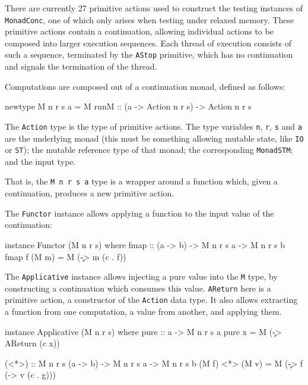 
There are currently 27 primitive actions used to construct the testing
instances of \verb|MonadConc|, one of which only arises when testing
under relaxed memory. These primitive actions contain a continuation,
allowing individual actions to be composed into larger execution
sequences. Each thread of execution consists of such a sequence,
terminated by the \verb|AStop| primitive, which has no continuation
and signals the termination of the thread.


Computations are composed out of a continuation monad, defined as
follows:

\begin{haskellcode}
newtype M n r s a = M
  { runM :: (a -> Action n r s) -> Action n r s }
\end{haskellcode}

The \verb|Action| type is the type of primitive actions. The type
variables \verb|n|, \verb|r|, \verb|s| and \verb|a| are the underlying
monad (this must be something allowing mutable state, like \verb|IO|
or \verb|ST|); the mutable reference type of that monad; the
corresponding \verb|MonadSTM|; and the input type.

That is, the \verb|M n r s a| type is a wrapper around a function
which, given a continuation, produces a new primitive action.

The \verb|Functor| instance allows applying a function to the input
value of the continuation:

\begin{haskellcode}
instance Functor (M n r s) where
  fmap :: (a -> b) -> M n r s a -> M n r s b
  fmap f (M m) = M (\c -> m (c . f))
\end{haskellcode}

The \verb|Applicative| instance allows injecting a pure value into the
\verb|M| type, by constructing a continuation which consumes this
value. \verb|AReturn| here is a primitive action, a constructor of the
\verb|Action| data type. It also allows extracting a function from one
computation, a value from another, and applying them.

\begin{haskellcode}
instance Applicative (M n r s) where
  pure :: a -> M n r s a
  pure x = M (\c -> AReturn (c x))

  (<*>) :: M n r s (a -> b) -> M n r s a -> M n r s b
  (M f) <*> (M v) = M (\c -> f (\g -> v (c . g)))
\end{haskellcode}

